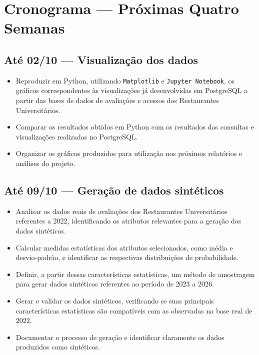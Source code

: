 \documentclass{article}
\begin{document}
\section{Cronograma --- Próximas Quatro Semanas}
\label{sec:cronograma}

\subsection{Até 02/10 --- Visualização dos dados}
\label{ssec:etapa1}

\begin{itemize}
    \item Reproduzir em Python, utilizando \texttt{Matplotlib} e \texttt{Jupyter Notebook}, os gráficos correspondentes às visualizações já desenvolvidas em PostgreSQL a partir das bases de dados de avaliações e acessos dos Restaurantes Universitários.
    \item Comparar os resultados obtidos em Python com os resultados das consultas e visualizações realizadas no PostgreSQL.
    \item Organizar os gráficos produzidos para utilização nos próximos relatórios e análises do projeto.
\end{itemize}

\subsection{Até 09/10 --- Geração de dados sintéticos}
\label{ssec:etapa2}

\begin{itemize}
    \item Analisar os dados reais de avaliações dos Restaurantes Universitários referentes a 2022, identificando os atributos relevantes para a geração dos dados sintéticos.
    \item Calcular medidas estatísticas dos atributos selecionados, como média e desvio-padrão, e identificar as respectivas distribuições de probabilidade.
    \item Definir, a partir dessas características estatísticas, um método de amostragem para gerar dados sintéticos referentes ao período de 2023 a 2026.
    \item Gerar e validar os dados sintéticos, verificando se suas principais características estatísticas são compatíveis com as observadas na base real de 2022.
    \item Documentar o processo de geração e identificar claramente os dados produzidos como sintéticos.
\end{itemize}
\end{document}

